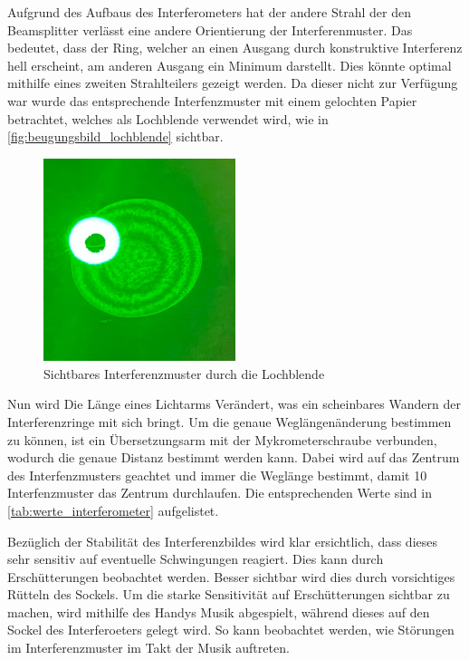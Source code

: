 \documentclass[12pt,english,ngerman]{scrartcl}
\begin{document}
Aufgrund des Aufbaus des Interferometers hat der andere Strahl der den Beamsplitter verlässt eine andere Orientierung 
der Interferenmuster. Das bedeutet, dass der Ring, welcher an einen Ausgang durch konstruktive Interferenz hell erscheint,
am anderen Ausgang ein Minimum darstellt. Dies könnte optimal mithilfe eines zweiten Strahlteilers gezeigt werden. Da dieser 
nicht zur Verfügung war wurde das entsprechende Interfenzmuster mit einem gelochten Papier betrachtet, welches als Lochblende 
verwendet wird, wie in \autoref{fig:beugungsbild_lochblende} sichtbar.

\begin{figure}[H]
	\begin{center}
		\includegraphics[width =0.5\textwidth]{./figures/Blende.JPG}
	\end{center}
	\caption[Sichtbares Interferenzmuster durch die Lochblende] {
        Sichtbares Interferenzmuster durch die Lochblende
	}\label{fig:beugungsbild_lochblende}
\end{figure}

Nun wird Die Länge eines Lichtarms Verändert, was ein scheinbares Wandern der Interferenzringe mit sich bringt. Um die genaue 
Weglängenänderung bestimmen zu können, ist ein Übersetzungsarm mit der Mykrometerschraube verbunden, wodurch die genaue 
Distanz bestimmt werden kann. Dabei wird auf das Zentrum des Interfenzmusters geachtet und immer die Weglänge bestimmt,
damit 10 Interfenzmuster das Zentrum durchlaufen. Die entsprechenden Werte sind in \autoref{tab:werte_interferometer} aufgelistet.


Bezüglich der Stabilität des Interferenzbildes wird klar ersichtlich, dass dieses sehr sensitiv auf eventuelle Schwingungen 
reagiert. Dies kann durch Erschütterungen beobachtet werden. Besser sichtbar wird dies durch vorsichtiges Rütteln des 
Sockels. Um die starke Sensitivität auf Erschütterungen sichtbar zu machen, wird mithilfe des Handys Musik abgespielt, 
während dieses auf den Sockel des Interferoeters gelegt wird. So kann beobachtet werden, wie Störungen im Interferenzmuster
im Takt der Musik auftreten. 
\end{document}
